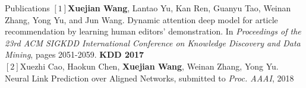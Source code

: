 \documentclass{resume} %
\begin{document}
\begin{rSection}{Publications}
$[1]$\textbf{Xuejian Wang}, Lantao Yu, Kan Ren, Guanyu Tao, Weinan Zhang, Yong Yu, and Jun Wang. Dynamic attention deep model for article recommendation by learning human editors' demonstration. In \emph{Proceedings of the 23rd ACM SIGKDD International Conference on Knowledge Discovery and Data Mining}, pages 2051-2059. \textbf{KDD 2017} \\
$[2]$Xuezhi Cao, Haokun Chen, \textbf{Xuejian Wang}, Weinan Zhang, Yong Yu. Neural Link Prediction over Aligned Networks, submitted to  \emph{Proc. AAAI}, 2018
\end{rSection}
\end{document}
